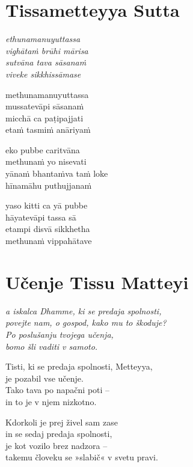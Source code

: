

\cleartoverso
\chapter*{Tissametteyya Sutta}

\emph{ethunamanuyuttassa\\
vighātaṁ brūhi mārisa\\
sutvāna tava sāsanaṁ\\
viveke sikkhissāmase}

methunamanuyuttassa\\
mussatevāpi sāsanaṁ\\
micchā ca paṭipajjati\\
etaṁ tasmiṁ anāriyaṁ

eko pubbe caritvāna\\
methunaṁ yo nisevati\\
yānaṁ bhantaṁva taṁ loke\\
hīnamāhu puthujjanaṁ

yaso kitti ca yā pubbe\\
hāyatevāpi tassa sā\\
etampi disvā sikkhetha\\
methunaṁ vippahātave


\cleartorecto
\chapter{Učenje Tissu Matteyi}

\emph{a iskalca Dhamme, ki se predaja spolnosti,\\
povejte nam, o gospod, kako mu to škoduje?\\
Po poslušanju tvojega učenja,\\
bomo šli vaditi v samoto.}

Tisti, ki se predaja spolnosti, Metteyya,\\
je pozabil vse učenje.\\
Tako tava po napačni poti --\\
in to je v njem nizkotno.

Kdorkoli je prej živel sam zase\\
in se sedaj predaja spolnosti,\\
je kot vozilo brez nadzora --\\
takemu človeku se »slabič« v svetu pravi.

